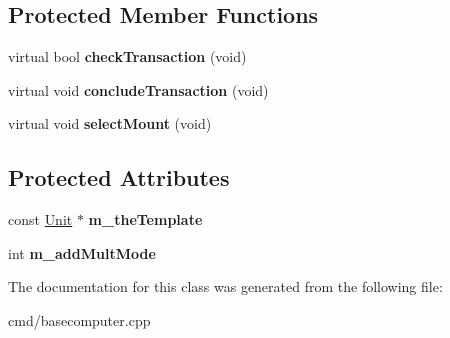 \subsection*{Protected Member Functions}
\begin{DoxyCompactItemize}
\item 
virtual bool {\bfseries check\+Transaction} (void)\hypertarget{classBaseComputer_1_1BuyUpgradeOperation_ad41ce992ca056177415307334d11ba0a}{}\label{classBaseComputer_1_1BuyUpgradeOperation_ad41ce992ca056177415307334d11ba0a}

\item 
virtual void {\bfseries conclude\+Transaction} (void)\hypertarget{classBaseComputer_1_1BuyUpgradeOperation_a3be516482657a819f2336f042c318835}{}\label{classBaseComputer_1_1BuyUpgradeOperation_a3be516482657a819f2336f042c318835}

\item 
virtual void {\bfseries select\+Mount} (void)\hypertarget{classBaseComputer_1_1BuyUpgradeOperation_a0049c6296aadd429f8ce78643f607470}{}\label{classBaseComputer_1_1BuyUpgradeOperation_a0049c6296aadd429f8ce78643f607470}

\end{DoxyCompactItemize}
\subsection*{Protected Attributes}
\begin{DoxyCompactItemize}
\item 
const \hyperlink{classUnit}{Unit} $\ast$ {\bfseries m\+\_\+the\+Template}\hypertarget{classBaseComputer_1_1BuyUpgradeOperation_a81d86105ada8d8b37458d61293e1a86c}{}\label{classBaseComputer_1_1BuyUpgradeOperation_a81d86105ada8d8b37458d61293e1a86c}

\item 
int {\bfseries m\+\_\+add\+Mult\+Mode}\hypertarget{classBaseComputer_1_1BuyUpgradeOperation_a4365e5f49019bf088d538060281a8a0c}{}\label{classBaseComputer_1_1BuyUpgradeOperation_a4365e5f49019bf088d538060281a8a0c}

\end{DoxyCompactItemize}


The documentation for this class was generated from the following file\+:\begin{DoxyCompactItemize}
\item 
cmd/basecomputer.\+cpp\end{DoxyCompactItemize}
